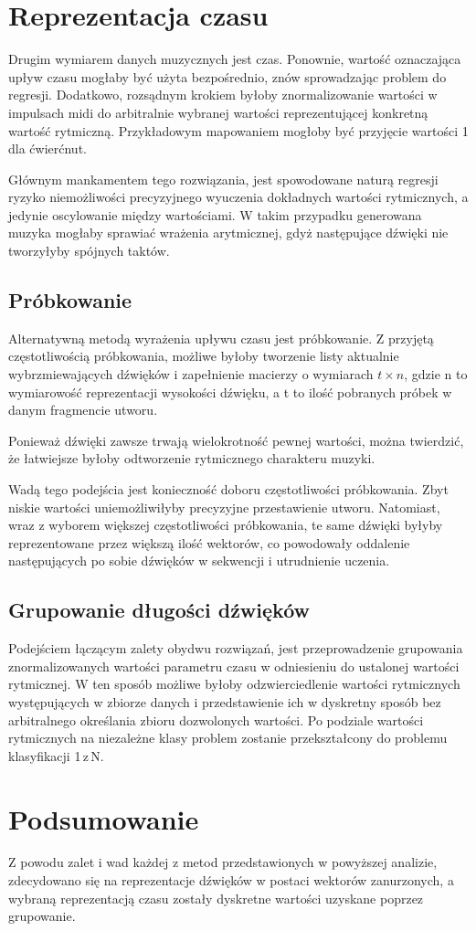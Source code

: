{    \section{Reprezentacja czasu}
    {
        Drugim wymiarem danych muzycznych jest czas. Ponownie, wartość oznaczająca upływ czasu
        mogłaby być użyta bezpośrednio, znów sprowadzając problem do regresji. Dodatkowo, rozsądnym krokiem
        byłoby znormalizowanie wartości w impulsach midi do arbitralnie wybranej wartości reprezentującej konkretną
        wartość rytmiczną. Przykładowym mapowaniem mogłoby być przyjęcie wartości 1 dla ćwierćnut.

        Głównym mankamentem tego rozwiązania, jest spowodowane naturą regresji ryzyko niemożliwości precyzyjnego wyuczenia 
        dokładnych wartości rytmicznych, a jedynie oscylowanie między wartościami. W takim przypadku generowana muzyka
        mogłaby sprawiać wrażenia arytmicznej, gdyż następujące dźwięki nie tworzyłyby spójnych taktów. 

        \subsection{Próbkowanie}
        {
            Alternatywną metodą wyrażenia upływu czasu jest próbkowanie. Z przyjętą częstotliwością próbkowania, 
            możliwe byłoby tworzenie listy aktualnie wybrzmiewających dźwięków i zapełnienie macierzy o wymiarach \(t \times n\), gdzie n to
            wymiarowość reprezentacji wysokości dźwięku, a t to ilość pobranych próbek w danym fragmencie utworu.
            
            Ponieważ dźwięki zawsze trwają wielokrotność pewnej wartości, można twierdzić, że łatwiejsze byłoby 
            odtworzenie rytmicznego charakteru muzyki.
            
            Wadą tego podejścia jest konieczność doboru częstotliwości próbkowania. Zbyt niskie wartości 
            uniemożliwiłyby precyzyjne przestawienie utworu. Natomiast, wraz z wyborem większej częstotliwości próbkowania,
            te same dźwięki byłyby reprezentowane przez większą ilość wektorów, 
            co powodowały oddalenie następujących po sobie dźwięków w sekwencji i utrudnienie uczenia.
        }

        \subsection{Grupowanie długości dźwięków}
        {
            Podejściem łączącym zalety obydwu rozwiązań, jest przeprowadzenie grupowania znormalizowanych wartości parametru czasu w
            odniesieniu do ustalonej wartości rytmicznej. W ten sposób możliwe byłoby odzwierciedlenie wartości rytmicznych
            występujących w zbiorze danych i przedstawienie ich w dyskretny sposób bez arbitralnego określania zbioru dozwolonych
            wartości. 
            Po podziale wartości rytmicznych na niezależne klasy problem zostanie przekształcony do problemu klasyfikacji 1\,z\,N. 
        }
    }

    \section{Podsumowanie}
    {
        Z powodu zalet i wad każdej z metod przedstawionych w powyższej analizie, zdecydowano się na reprezentacje dźwięków w postaci
        wektorów zanurzonych, a wybraną reprezentacją czasu zostały dyskretne wartości uzyskane poprzez grupowanie.
    }
}